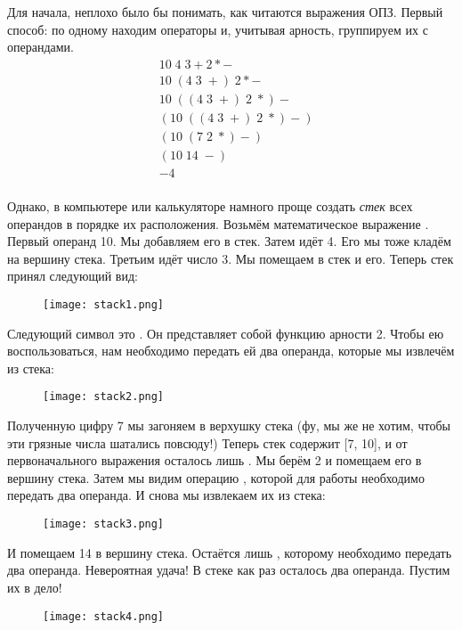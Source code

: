 Для начала, неплохо было бы понимать, как читаются выражения ОПЗ.
Первый способ: по одному находим операторы и, учитывая арность, группируем их с операндами.
\begin{align*}
    &10\;4\;3+2 * -\\
    &10\;(4\;3\; +)\;2 * -\\
    &10\; ((4\; 3\; +)\; 2\; *) -\\ 
    &(10\; ((4\; 3\; +)\; 2\; *) -)\\
    &(10\; (7\; 2\; *) -)\\
    &(10\; 14\; -)\\
    &-4\\
\end{align*}

Однако, в компьютере или калькуляторе намного проще создать \emph{стек} всех операндов в порядке их расположения.
Возьмём математическое выражение .
Первый операнд 10.
Мы добавляем его в стек.
Затем идёт 4.
Его мы тоже кладём на вершину стека.
Третьим идёт число 3.
Мы помещаем в стек и его.
Теперь стек принял следующий вид:
\begin{figure}[h!]
    \centering
    \texttt{[image: stack1.png]}
\end{figure}

Следующий символ это \ops{+\strut}.
Он представляет собой функцию арности 2.
Чтобы ею воспользоваться, нам необходимо передать ей два операнда, которые мы извлечём из стека:
\begin{figure}[h!]
    \centering
    \texttt{[image: stack2.png]}
\end{figure}

Полученную цифру 7 мы загоняем в верхушку стека (фу, мы же не хотим, чтобы эти грязные числа шатались повсюду!)
Теперь стек содержит [7, 10], и от первоначального выражения осталось лишь .
Мы берём 2 и помещаем его в вершину стека.
Затем мы видим операцию \ops{*\strut}, которой для работы необходимо передать два операнда.
И снова мы извлекаем их из стека:
\begin{figure}[h!]
    \centering
    \texttt{[image: stack3.png]}
\end{figure}

И помещаем 14 в вершину стека.
Остаётся лишь \ops{-\strut}, которому необходимо передать два операнда.
Невероятная удача!
В стеке как раз осталось два операнда.
Пустим их в дело!
\begin{figure}[h!]
    \centering
    \texttt{[image: stack4.png]}
\end{figure}

